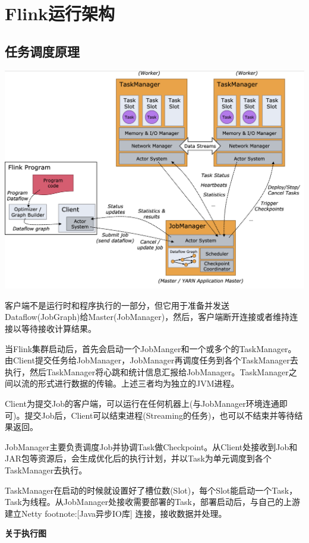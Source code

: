 \documentclass{ctexart}
\begin{document}
\section{Flink运行架构}

\subsection{任务调度原理}

\includegraphics[width=\textwidth]{processes.png}

客户端不是运行时和程序执行的一部分，但它用于准备并发送Dataflow(JobGraph)给Master(JobManager)，然后，客户端断开连接或者维持连接以等待接收计算结果。

当Flink集群启动后，首先会启动一个JobManger和一个或多个的TaskManager。由Client提交任务给JobManager，JobManager再调度任务到各个TaskManager去执行，然后TaskManager将心跳和统计信息汇报给JobManager。TaskManager之间以流的形式进行数据的传输。上述三者均为独立的JVM进程。

Client为提交Job的客户端，可以运行在任何机器上(与JobManager环境连通即可)。提交Job后，Client可以结束进程(Streaming的任务)，也可以不结束并等待结果返回。

JobManager主要负责调度Job并协调Task做Checkpoint。从Client处接收到Job和JAR包等资源后，会生成优化后的执行计划，并以Task为单元调度到各个TaskManager去执行。

TaskManager在启动的时候就设置好了槽位数(Slot)，每个Slot能启动一个Task，Task为线程。从JobManager处接收需要部署的Task，部署启动后，与自己的上游建立Netty footnote:[Java异步IO库] 连接，接收数据并处理。

\textbf{关于执行图}
\end{document}

